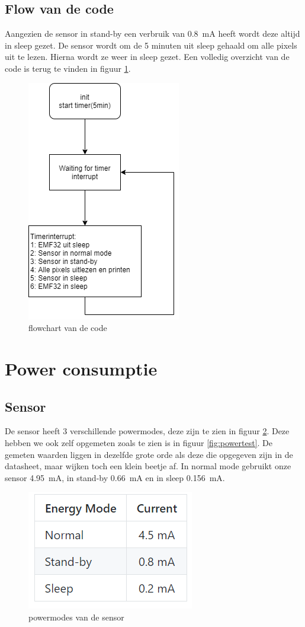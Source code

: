 \documentclass[]{article}
\begin{document}
\subsection{Flow van de code}
\label{flowcode}
Aangezien de sensor in stand-by een verbruik van 0.8~mA heeft wordt deze altijd in sleep gezet. De sensor wordt om de 5 minuten uit sleep gehaald om alle pixels uit te lezen. Hierna wordt ze weer in sleep gezet. Een volledig overzicht van de code is terug te vinden in figuur \ref{fig:flowchart}.

\begin{figure}[!ht]
	\centering
	\includegraphics[scale=0.5]{flowchart.png}
	\caption{flowchart van de code}
	\label{fig:flowchart}
\end{figure}


\section{Power consumptie}
\subsection{Sensor}
De sensor heeft 3 verschillende powermodes, deze zijn te zien in figuur \ref{fig:sensor_power}. Deze hebben we ook zelf opgemeten zoals te zien is in figuur \ref{fig:powertest}. De gemeten waarden liggen in dezelfde grote orde als deze die opgegeven zijn in de datasheet, maar wijken toch een klein beetje af. In normal mode gebruikt onze sensor 4.95~mA, in stand-by 0.66~mA en in sleep  0.156~mA.

\begin{figure}[!ht]
	\centering
	\includegraphics{sensor_power.png}
	\caption{powermodes van de sensor}
	\label{fig:sensor_power}
\end{figure}
\end{document}

